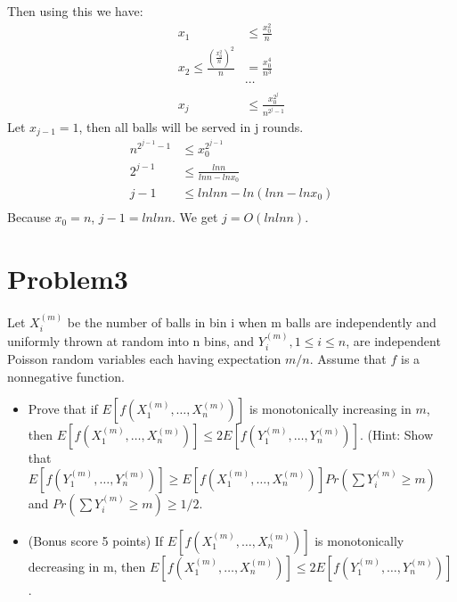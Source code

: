 \documentclass[12pt]{article}
\begin{document}
Then using this we have:
\begin{equation}
    \begin{split}
    x_1 &\le \frac{x_0^2}{n} \\
    x_2 \le \frac{(\frac{x_0^2}{n})^2}{n} &= \frac{x_0^4}{n^3}\\
    &\cdots \\
    x_j &\le \frac{x_0^{2^j}}{n^{2^j-1}}
    \end{split}
\end{equation}
Let $x_{j-1}=1$, then all balls will be served in j rounds.
\begin{equation}
    \begin{split}
    n^{2^{j-1}-1} &\le x_0^{2^{j-1}} \\
    2^{j-1} &\le \frac{ln n}{ln n - ln x_0} \\
    j-1 &\le ln ln n - ln(ln n - ln x_0) \\
    \end{split}
\end{equation}
Because $x_0=n$, $j-1 = ln ln n$. We get $j = O(ln ln n)$.

\section{Problem3}
Let $X^{(m)}_i$ be the number of balls in bin i when m balls are independently and uniformly thrown at random into n bins, and $Y^{(m)}_i , 1 \le i \le n$, are independent Poisson random variables each having expectation $m/n$. Assume that $f$ is a nonnegative function.
\begin{itemize}
\item Prove that if $E[f(X_1^{(m)}, \dots, X_n^{(m)})]$ is monotonically increasing in $m$, then $E[f(X_1^{(m)}, \dots, X_n^{(m)})] \le 2E[f(Y_1^{(m)}, \dots, Y_n^{(m)})]$. (Hint: Show that $E[f(Y_1^{(m)}, \dots, Y_n^{(m)})] \ge E[f(X_1^{(m)}, \dots, X_n^{(m)})] Pr(\sum Y_i^{(m)} \ge m)$ and $Pr(\sum Y_i^{(m)} \ge m) \ge 1/2$.
\item (Bonus score 5 points) If $E[f(X_1^{(m)}, \dots, X_n^{(m)})]$ is monotonically decreasing in m, then $E[f(X_1^{(m)}, \dots, X_n^{(m)})] \le 2E[f(Y_1^{(m)}, \dots, Y_n^{(m)})]$.
\end{itemize}
\end{document}
